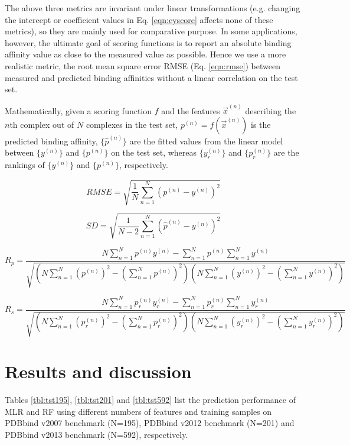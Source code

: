\documentclass[journal=jacsat,manuscript=article]{achemso}
\begin{document}
The above three metrics are invariant under linear transformations (e.g. changing the intercept or coefficient values in Eq. \ref{eqn:cyscore} affects none of these metrics), so they are mainly used for comparative purpose. In some applications, however, the ultimate goal of scoring functions is to report an absolute binding affinity value as close to the measured value as possible. Hence we use a more realistic metric, the root mean square error RMSE (Eq. \ref{eqn:rmse}) between measured and predicted binding affinities without a linear correlation on the test set.

Mathematically, given a scoring function $f$ and the features $\overrightarrow{x}^{(n)}$ describing the $n$th complex out of $N$ complexes in the test set, $p^{(n)}=f(\overrightarrow{x}^{(n)})$ is the predicted binding affinity, $\{\hat{p}^{(n)}\}$ are the fitted values from the linear model between $\{y^{(n)}\}$ and $\{p^{(n)}\}$ on the test set, whereas $\{y_r^{(n)}\}$ and $\{p_r^{(n)}\}$ are the rankings of $\{y^{(n)}\}$ and $\{p^{(n)}\}$, respectively. 

\begin{equation}
RMSE = \sqrt{\frac{1}{N}\sum_{n=1}^N(p^{(n)}-y^{(n)})^2}
\label{eqn:rmse}
\end{equation}

\begin{equation}
SD = \sqrt{\frac{1}{N-2}\sum_{n=1}^N(\hat{p}^{(n)}-y^{(n)})^2}
\label{eqn:sd}
\end{equation}

\begin{equation}
R_p = \frac{N\sum_{n=1}^Np^{(n)}y^{(n)}-\sum_{n=1}^Np^{(n)}\sum_{n=1}^Ny^{(n)}}{\sqrt{(N\sum_{n=1}^N(p^{(n)})^2-(\sum_{n=1}^Np^{(n)})^2)(N\sum_{n=1}^N(y^{(n)})^2-(\sum_{n=1}^Ny^{(n)})^2)}}
\label{eqn:rp}
\end{equation}

\begin{equation}
R_s = \frac{N\sum_{n=1}^Np_r^{(n)}y_r^{(n)}-\sum_{n=1}^Np_r^{(n)}\sum_{n=1}^Ny_r^{(n)}}{\sqrt{(N\sum_{n=1}^N(p_r^{(n)})^2-(\sum_{n=1}^Np_r^{(n)})^2)(N\sum_{n=1}^N(y_r^{(n)})^2-(\sum_{n=1}^Ny_r^{(n)})^2)}}
\label{eqn:rs}
\end{equation}

\section{Results and discussion}

Tables \ref{tbl:tst195}, \ref{tbl:tst201} and \ref{tbl:tst592} list the prediction performance of MLR and RF using different numbers of features and training samples on PDBbind v2007 benchmark (N=195), PDBbind v2012 benchmark (N=201) and PDBbind v2013 benchmark (N=592), respectively. %
\end{document}

